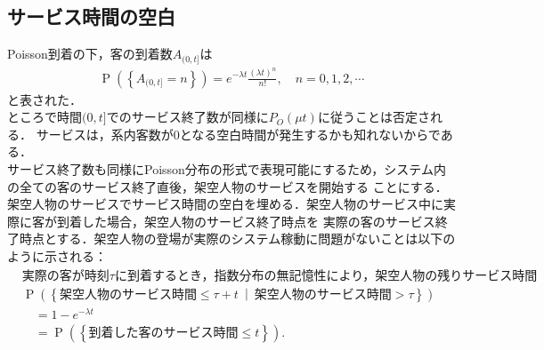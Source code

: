 \documentclass[a4j,papersize,disablejfam,slide,14pt]{jsarticle}
\def\exp#1{e^{#1}} %
\def\prob#1{\operatorname{P} \left(\left\{ #1 \right\}\right)} %
\def\cprob#1#2{\operatorname{P} \left(\left\{ #1 \ \middle|\ #2 \right\}\right)} %
\begin{document}
\subsection{サービス時間の空白}
    {\rm Poisson}到着の下，客の到着数$A_{(0, t]}$は
    \begin{align}
    	\prob{A_{(0, t]} = n} = \exp{-\lambda t} \frac{(\lambda t)^n}{n!}, \quad n = 0, 1, 2, \cdots
    \end{align}
    と表された．\\
    ところで時間$(0, t]$でのサービス終了数が同様に$P_O(\mu t)$に従うことは否定される．
    サービスは，系内客数が$0$となる空白時間が発生するかも知れないからである．\\
    サービス終了数も同様に{\rm Poisson}分布の形式で表現可能にするため，システム内の全ての客のサービス終了直後，架空人物のサービスを開始する
    ことにする．架空人物のサービスでサービス時間の空白を埋める．架空人物のサービス中に実際に客が到着した場合，架空人物のサービス終了時点を
    実際の客のサービス終了時点とする．架空人物の登場が実際のシステム稼動に問題がないことは以下のように示される：
    \begin{align}
    	&\mbox{実際の客が時刻$\tau$に到着するとき，指数分布の無記憶性により，架空人物の残りサービス時間も同分布に従う．} \\
    	&\cprob{\mbox{架空人物のサービス時間} \leq \tau + t}{\mbox{架空人物のサービス時間} > \tau} \\
        &\quad= 1 - \exp{-\lambda t} \\
        &\quad= \prob{\mbox{到着した客のサービス時間} \leq t}.
    \end{align}
\end{document}
